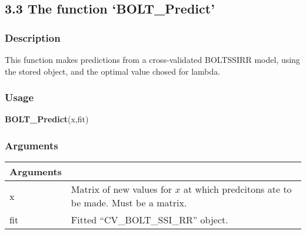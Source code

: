 \documentclass[]{article}
\newenvironment{Shaded}{\begin{snugshade}}{\end{snugshade}}
\newcommand{\KeywordTok}[1]{\textcolor[rgb]{0.13,0.29,0.53}{\textbf{#1}}}
\newcommand{\NormalTok}[1]{#1}
\begin{document}
\subsection{\texorpdfstring{3.3 The function
`BOLT\_Predict'}{3.3 The function BOLT\_Predict}}\label{the-function-bolt_predict}

\subsubsection{Description}\label{description-2}

This function makes predictions from a cross-validated BOLTSSIRR model,
using the stored object, and the optimal value chosed for lambda.

\subsubsection{Usage}\label{usage-2}

\begin{Shaded}
\begin{Highlighting}[]
\KeywordTok{BOLT_Predict}\NormalTok{(x,fit)}
\end{Highlighting}
\end{Shaded}

\subsubsection{Arguments}\label{arguments-2}

\begin{longtable}[]{@{}ll@{}}
\toprule
\begin{minipage}[b]{0.12\columnwidth}\raggedright\strut
Arguments\strut
\end{minipage} & \begin{minipage}[b]{0.82\columnwidth}\raggedright\strut
\strut
\end{minipage}\tabularnewline
\midrule
\endhead
\begin{minipage}[t]{0.12\columnwidth}\raggedright\strut
x\strut
\end{minipage} & \begin{minipage}[t]{0.82\columnwidth}\raggedright\strut
Matrix of new values for \(x\) at which predcitons ate to be made. Must
be a matrix.\strut
\end{minipage}\tabularnewline
\begin{minipage}[t]{0.12\columnwidth}\raggedright\strut
fit\strut
\end{minipage} & \begin{minipage}[t]{0.82\columnwidth}\raggedright\strut
Fitted ``CV\_BOLT\_SSI\_RR'' object.\strut
\end{minipage}\tabularnewline
\bottomrule
\end{longtable}
\end{document}
